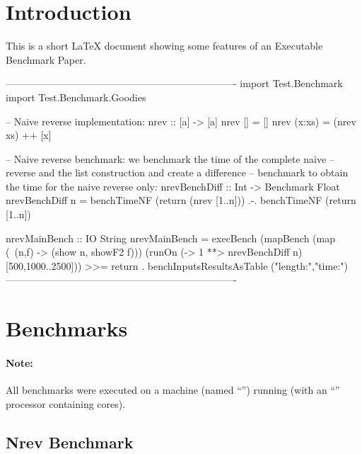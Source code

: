 \documentclass{article}
\begin{document}
\sloppy

\section{Introduction}

This is a short LaTeX document showing some features of an
Executable Benchmark Paper.

\begin{curryprog}
----------------------------------------------------------------------
import Test.Benchmark
import Test.Benchmark.Goodies

-- Naive reverse implementation:
nrev :: [a] -> [a]
nrev []     = []
nrev (x:xs) = (nrev xs) ++ [x]

-- Naive reverse benchmark: we benchmark the time of the complete naive
-- reverse and the list construction and create a difference
-- benchmark to obtain the time for the naive reverse only:
nrevBenchDiff :: Int -> Benchmark Float
nrevBenchDiff n =
  benchTimeNF (return (nrev [1..n]))  .-.  benchTimeNF (return [1..n])

nrevMainBench :: IO String
nrevMainBench =
  execBench (mapBench (map (\ (n,f) -> (show n, showF2 f)))
               (runOn (\n -> 1 **> nrevBenchDiff n) [500,1000..2500])) >>=
    return . benchInputsResultsAsTable ("length:","time:")
----------------------------------------------------------------------
\end{curryprog}

\section{Benchmarks}

\paragraph{Note:}
%
All benchmarks were executed on a  machine
(named ``'')
running  
(with an ``'' processor containing
 cores).

\subsection{Nrev Benchmark}

\begin{center}
\end{center}
\end{document}
